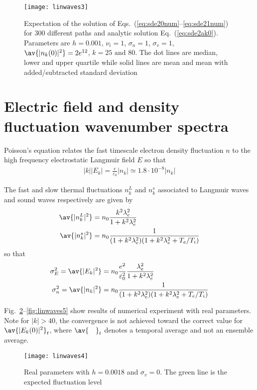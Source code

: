 \documentclass[10pt,a4paper]{article}
\newcommand{\eq}[1]{Eq.~(#1)}
\newcommand{\eqs}[1]{Eqs.~(#1)}
\newcommand{\fig}[1]{Fig.~#1}
\begin{document}
\begin{figure}[ht]
\centering\texttt{[image: linwaves3]}
\caption{Expectation of the solution of \eqs{\ref{eq:sde20num}--\ref{eq:sde21num}}
for 300 different paths and analytic solution \eq{\ref{eq:sde2ak0}}.
Parameters are $h=0.001$, $\nu_i=1$, $\sigma_n=1$, $\sigma_v=1$, 
$\av{|n_k(0)|^2}=2e^{12}$, $k=25\mbox{ and }80$.
The dot lines are median, lower and upper quartile while solid lines are mean and mean with
added/subtracted standard deviation}
\label{fig:linwaves3}
\end{figure}


\section{Electric field and density fluctuation wavenumber spectra}

Poisson's equation relates the fast timescale electron density fluctuation $n$ to the high
frequency electrostatic Langmuir field $E$ so that
\begin{align}
|k| |E_k| = \frac{e}{\varepsilon_0} |n_k| \simeq 1.8\cdot10^{-8} |n_k|
\end{align}

The fast and slow thermal fluctuations $n^L_k$ and $n^s_k$ associated to Langmuir waves and 
sound waves respectively are given by
\begin{align}
\av{|n^L_k|^2} &= n_0\frac{k^2\lambda_e^2}{1+k^2\lambda_e^2}\\
\av{|n^s_k|^2} &= n_0\frac{1}{(1+k^2\lambda_e^2)(1+k^2\lambda_e^2+T_e/T_i)}
\end{align}
so that
\begin{align}
\sigma_E^2 = \av{|E_k|^2} &= n_0\frac{e^2}{\varepsilon_0^2}\frac{\lambda_e^2}{1+k^2\lambda_e^2}\\
\sigma_n^2 = \av{|n_k|^2} &= n_0\frac{1}{(1+k^2\lambda_e^2)(1+k^2\lambda_e^2+T_e/T_i)}
\end{align}


\fig{\ref{fig:linwaves4}--\ref{fig:linwaves5}} show results of numerical
experiment with real
parameters. Note for $|k|>40$, the convergence is not achieved toward the
correct value for $\av{|E_k(0)|^2}_t$, where $\av{\quad}_t$ denotes a temporal
average and not an ensemble average.

\begin{figure}
\centering\texttt{[image: linwaves4]}
\caption{Real parameters with $h=0.0018$ and $\sigma_v=0$. 
The green line is the expected fluctuation level}
\label{fig:linwaves4}
\end{figure}
\end{document}
